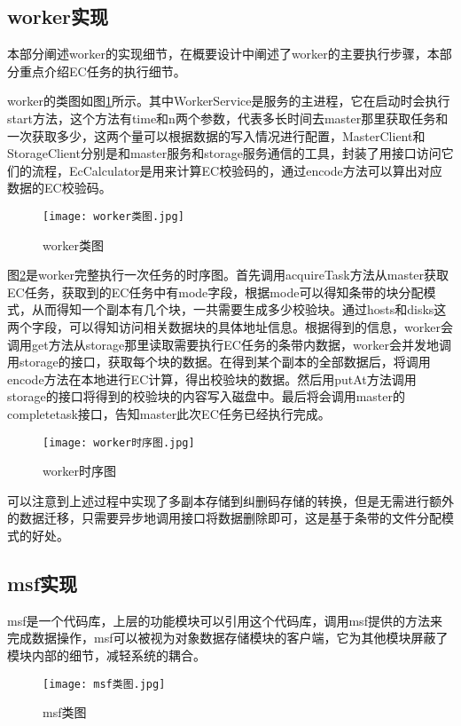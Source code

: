 \subsection{worker实现}%
本部分阐述worker的实现细节，在概要设计中阐述了worker的主要执行步骤，本部分重点介绍EC任务的执行细节。

worker的类图如图\ref{worker类图}所示。其中WorkerService是服务的主进程，它在启动时会执行start方法，这个方法有time和n两个参数，代表多长时间去master那里获取任务和一次获取多少，这两个量可以根据数据的写入情况进行配置，MasterClient和StorageClient分别是和master服务和storage服务通信的工具，封装了用接口访问它们的流程，EcCalculator是用来计算EC校验码的，通过encode方法可以算出对应数据的EC校验码。

\begin{figure}
  \centering
  \texttt{[image: worker类图.jpg]}
  \caption{worker类图}
  \label{worker类图}
\end{figure}

图\ref{worker时序图}是worker完整执行一次任务的时序图。首先调用acquireTask方法从master获取EC任务，获取到的EC任务中有mode字段，根据mode可以得知条带的块分配模式，从而得知一个副本有几个块，一共需要生成多少校验块。通过hosts和disks这两个字段，可以得知访问相关数据块的具体地址信息。根据得到的信息，worker会调用get方法从storage那里读取需要执行EC任务的条带内数据，worker会并发地调用storage的接口，获取每个块的数据。在得到某个副本的全部数据后，将调用encode方法在本地进行EC计算，得出校验块的数据。然后用putAt方法调用storage的接口将得到的校验块的内容写入磁盘中。最后将会调用master的completetask接口，告知master此次EC任务已经执行完成。

\begin{figure}
  \centering
  \texttt{[image: worker时序图.jpg]}
  \caption{worker时序图}
  \label{worker时序图}
\end{figure}

可以注意到上述过程中实现了多副本存储到纠删码存储的转换，但是无需进行额外的数据迁移，只需要异步地调用接口将数据删除即可，这是基于条带的文件分配模式的好处。

\subsection{msf实现}%
msf是一个代码库，上层的功能模块可以引用这个代码库，调用msf提供的方法来完成数据操作，msf可以被视为对象数据存储模块的客户端，它为其他模块屏蔽了模块内部的细节，减轻系统的耦合。

\begin{figure}
  \centering
  \texttt{[image: msf类图.jpg]}
  \caption{msf类图}
  \label{msf类图}
\end{figure}

